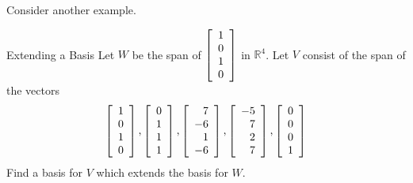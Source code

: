 Consider another example.

\begin{example}{Extending a Basis}{}
Let $W$ be the span of $\left[
\begin{array}{c}
1 \\ 
0 \\ 
1 \\ 
0
\end{array}
\right] $ in $\mathbb{R}^{4}$. Let $V$ consist of the span of the vectors 
\begin{equation*}
\left[
\begin{array}{c}
1 \\ 
0 \\ 
1 \\ 
0
\end{array}
\right] ,\left[ 
\begin{array}{c}
0 \\ 
1 \\ 
1 \\ 
1
\end{array}
\right] ,\left[ 
\begin{array}{r}
7 \\ 
-6 \\ 
1 \\ 
-6
\end{array}
\right] ,\left[ 
\begin{array}{r}
-5 \\ 
7 \\ 
2 \\ 
7
\end{array}
\right] ,\left[ 
\begin{array}{c}
0 \\ 
0 \\ 
0 \\ 
1
\end{array}
\right]
\end{equation*}
Find a basis for $V$ which extends the basis for $W$.
\end{example}

